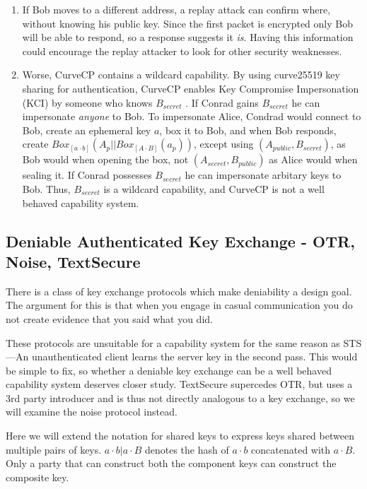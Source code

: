 \documentclass[12pt]{article}
\begin{document}
\begin{enumerate}
  \item If Bob moves to a different address, a replay attack can
    confirm where, without knowing his public key.
    Since the first packet is encrypted only Bob will be able to respond,
    so a response suggests it \emph{is}.
    Having this information could encourage the replay attacker
    to look for other security weaknesses.

  \item Worse, CurveCP contains a wildcard capability.
    By using curve25519 key sharing for authentication, CurveCP
    enables Key Compromise Impersonation (KCI) by someone who
    knows $B_{secret}$ \cite{ccp_review}. If Conrad gains
    $B_{secret}$ he can impersonate \emph{anyone} to Bob.
    To impersonate Alice, Condrad would connect to Bob,
    create an ephemeral key $a$, box it to Bob, and when Bob responds,
    create $Box_{[a\cdot b]}(A_p||Box_{[A \cdot B]}(a_p))$,
    except using $(A_{public}, B_{secret})$,
    as Bob would when opening the box, not $(A_{secret}, B_{public})$ as
    Alice would when sealing it. If Conrad possesses $B_{secret}$ he can
    impersonate arbitary keys to Bob. Thus, $B_{secret}$ is a wildcard
    capability, and CurveCP is not a well behaved capability system.

\end{enumerate}

\subsection{Deniable Authenticated Key Exchange - OTR, Noise, TextSecure}

There is a class of key exchange protocols which make deniability
a design goal\cite{otr, textsecure, noise}. The argument for this
is that when you engage in casual communication you do not create
evidence that you said what you did.

These protocols are unsuitable for a capability system for the same
reason as STS---An unauthenticated client learns the server key in
the second pass. This would be simple to fix, so whether a deniable
key exchange can be a well behaved capability system deserves closer study.
TextSecure\cite{textsecure} supercedes OTR\cite{otr}, but
uses a 3rd party introducer and is thus not directly analogous to
a key exchange, so we will examine the noise\cite{noise} protocol
instead.

Here we will extend the notation for shared keys to express keys shared
between multiple pairs of keys. $a \cdot b | a \cdot B$ denotes
the hash of $a \cdot b$ concatenated with $a \cdot B$. Only a party
that can construct both the component keys can construct the composite
key.
\end{document}
